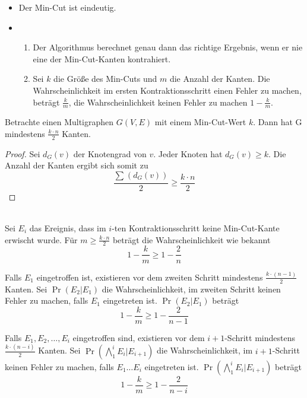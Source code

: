 \documentclass{scrartcl}%
\begin{document}
    \begin{itemize}
        \item {} Der Min-Cut ist eindeutig.
        \item {
        \begin{enumerate}
            \item Der Algorithmus berechnet genau dann das richtige Ergebnis,
            wenn er nie eine der Min-Cut-Kanten kontrahiert.
            \item Sei $k$ die Größe des Min-Cuts und $m$ die Anzahl der Kanten.
            Die Wahrscheinlichkeit im ersten Kontraktionsschritt einen Fehler zu machen, beträgt $\frac{k}{m}$,
            die Wahrscheinlichkeit keinen Fehler zu machen $1-\frac{k}{m}$.
        \end{enumerate} }
    \end{itemize}

    \begin{satz}
        Betrachte einen Multigraphen $G(V,E)$ mit einem Min-Cut-Wert $k$.
        Dann hat G mindestens $\frac{k \cdot n}{2}$ Kanten.
    \end{satz}
    \begin{proof}
        Sei $d_G(v)$ der Knotengrad von $v$. Jeder Knoten hat $d_G(v) \geq k$.
        Die Anzahl der Kanten ergibt sich somit zu
        \begin{equation*}
            \frac{\sum_{}^{}(d_G(v))}{2} \geq \frac{k \cdot n}{2}
        \end{equation*}
    \end{proof}\\

    Sei $E_i$ das Ereignis, dass im $i$-ten Kontraktionsschritt keine Min-Cut-Kante erwischt wurde.
    Für $m \geq \frac{k \cdot n}{2}$ beträgt die Wahrscheinlichkeit wie bekannt
    \begin{equation*}
        1-\frac{k}{m} \geq 1 - \frac{2}{n}
    \end{equation*}


    Falls $E_1$ eingetroffen ist, existieren vor dem zweiten Schritt mindestens $\frac{k \cdot (n-1)}{2}$ Kanten.
    Sei $\Pr(E_2 | E_1)$ die Wahrscheinlichkeit,
    im zweiten Schritt keinen Fehler zu machen, falls $E_1$ eingetreten ist.
    $\Pr(E_2 | E_1)$ beträgt
    \begin{equation*}
        1 - \frac{k}{m} \geq 1 - \frac{2}{n-1}
    \end{equation*}

    Falls $E_1, E_2, \dots , E_i$ eingetroffen sind,
    existieren vor dem $i+1$-Schritt mindestens $\frac{k \cdot (n-i)}{2}$ Kanten.
    Sei $\Pr(\bigwedge_{1}^i E_i|E_{i+1})$ die Wahrscheinlichkeit,
    im $i+1$-Schritt keinen Fehler zu machen, falls $E_1 \dots E_i$ eingetreten ist.
    $\Pr(\bigwedge_{1}^i E_i|E_{i+1})$  beträgt
    \begin{equation*}
        1 - \frac{k}{m} \geq 1 - \frac{2}{n-i}
    \end{equation*}
\end{document}
